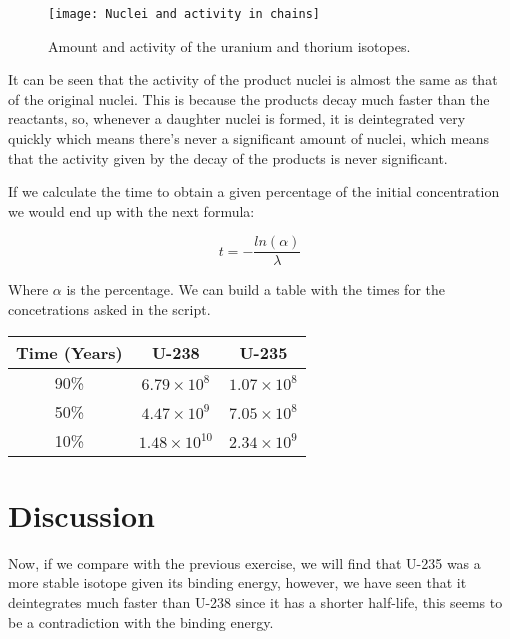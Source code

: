 \documentclass{article} %
\begin{document}
\begin{figure}[h!]
\begin{center}
\texttt{[image: Nuclei and activity in chains]}
\caption{Amount and activity of the uranium and thorium isotopes.}
\end{center}
\end{figure}

It can be seen that the activity of the product nuclei is almost the same as that of the original nuclei. This is because the products decay much faster than the reactants, so, whenever a daughter nuclei is formed, it is deintegrated very quickly which means there's never a significant amount of nuclei, which means that the activity given by the decay of the products is never significant.

If we calculate the time to obtain a given percentage of the initial concentration we would end up with the next formula:

\begin{equation}
t = -\frac{ln(\alpha)}{\lambda}
\end{equation}

Where $\alpha$ is the percentage. We can build a table with the times for the concetrations asked in the script.

\begin{center}
\begin{tabular}{|c|c|c|}
\hline
Time (Years) & U-238 & U-235 \\ \hline \hline
90\% & $6.79 \times 10^8$ & $1.07 \times 10^8$ \\
50\% & $4.47 \times 10^9$ & $7.05 \times 10^8$ \\
10\% & $1.48 \times 10^{10}$ & $2.34 \times 10^9$ \\ \hline
\end{tabular}
\end{center}

\section{Discussion}

Now, if we compare with the previous exercise, we will find that U-235 was a more stable isotope given its binding energy, however, we have seen that it deintegrates much faster than U-238 since it has a shorter half-life, this seems to be a contradiction with the binding energy.
\end{document}
